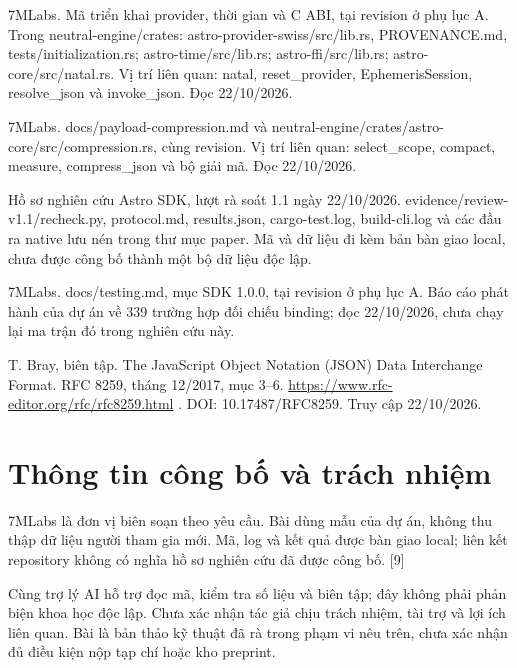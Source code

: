 \documentclass[11pt,a4paper]{article}
\begin{document}
{\fontsize{10}{11}\selectfont\raggedright\hangindent=18pt\noindent [7] 7MLabs. Mã triển khai provider, thời gian và C ABI, tại revision ở phụ lục A. Trong neutral-engine/\allowbreak{}crates: astro-provider-swiss/\allowbreak{}src/\allowbreak{}lib.rs, PROVENANCE.md, tests/\allowbreak{}initialization.rs; astro-time/\allowbreak{}src/\allowbreak{}lib.rs; astro-ffi/\allowbreak{}src/\allowbreak{}lib.rs; astro-core/\allowbreak{}src/\allowbreak{}natal.rs. Vị trí liên quan: natal, reset\_provider, EphemerisSession, resolve\_json và invoke\_json. Đọc 22/\allowbreak{}10/\allowbreak{}2026.\par}\vspace{1pt}
{\fontsize{10}{11}\selectfont\raggedright\hangindent=18pt\noindent [8] 7MLabs. docs/\allowbreak{}payload-compression.md và neutral-engine/\allowbreak{}crates/\allowbreak{}astro-core/\allowbreak{}src/\allowbreak{}compression.rs, cùng revision. Vị trí liên quan: select\_scope, compact, measure, compress\_json và bộ giải mã. Đọc 22/\allowbreak{}10/\allowbreak{}2026.\par}\vspace{1pt}
{\fontsize{10}{11}\selectfont\raggedright\hangindent=18pt\noindent [9] Hồ sơ nghiên cứu Astro SDK, lượt rà soát 1.1 ngày 22/\allowbreak{}10/\allowbreak{}2026. evidence/\allowbreak{}review-v1.1/\allowbreak{}recheck.py, protocol.md, results.json, cargo-test.log, build-cli.log và các đầu ra native lưu nén trong thư mục paper. Mã và dữ liệu đi kèm bản bàn giao local, chưa được công bố thành một bộ dữ liệu độc lập.\par}\vspace{1pt}
{\fontsize{10}{11}\selectfont\raggedright\hangindent=18pt\noindent [10] 7MLabs. docs/\allowbreak{}testing.md, mục SDK 1.0.0, tại revision ở phụ lục A. Báo cáo phát hành của dự án về 339 trường hợp đối chiếu binding; đọc 22/\allowbreak{}10/\allowbreak{}2026, chưa chạy lại ma trận đó trong nghiên cứu này.\par}\vspace{1pt}
{\fontsize{10}{11}\selectfont\raggedright\hangindent=18pt\noindent [11] T. Bray, biên tập. The JavaScript Object Notation (JSON) Data Interchange Format. RFC 8259, tháng 12/\allowbreak{}2017, mục 3–6. \url{https://www.rfc-editor.org/rfc/rfc8259.html} . DOI: 10.17487/\allowbreak{}RFC8259. Truy cập 22/\allowbreak{}10/\allowbreak{}2026.\par}\vspace{1pt}
\section*{Thông tin công bố và trách nhiệm}
7MLabs là đơn vị biên soạn theo yêu cầu. Bài dùng mẫu của dự án, không thu thập dữ liệu người tham gia mới. Mã, log và kết quả được bàn giao local; liên kết repository không có nghĩa hồ sơ nghiên cứu đã được công bố. [9]


Cùng trợ lý AI hỗ trợ đọc mã, kiểm tra số liệu và biên tập; đây không phải phản biện khoa học độc lập. Chưa xác nhận tác giả chịu trách nhiệm, tài trợ và lợi ích liên quan. Bài là bản thảo kỹ thuật đã rà trong phạm vi nêu trên, chưa xác nhận đủ điều kiện nộp tạp chí hoặc kho preprint.
\end{document}
